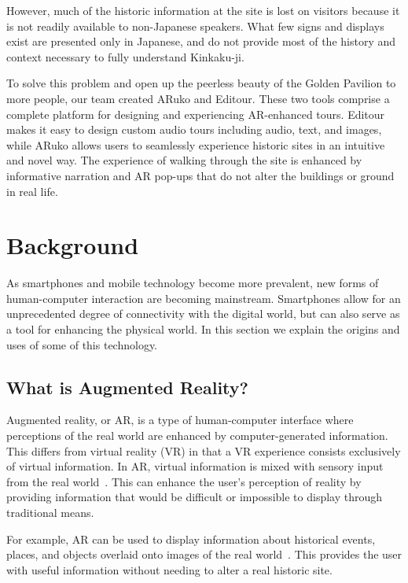 \documentclass[a4paper, 10pt, american, titlepage]{article}
\begin{document}
However, much of the historic information at the site is lost on visitors
because it is not readily available to non-Japanese speakers. What few signs and
displays exist are presented only in Japanese, and do not provide most of the
history and context necessary to fully understand Kinkaku-ji.

To solve this problem and open up the peerless beauty of the Golden Pavilion to
more people, our team created ARuko and Editour. These two tools comprise a
complete platform for designing and experiencing AR-enhanced tours. Editour
makes it easy to design custom audio tours including audio, text, and images,
while ARuko allows users to seamlessly experience historic sites in an intuitive
and novel way. The experience of walking through the site is enhanced by
informative narration and AR pop-ups that do not alter the buildings or ground
in real life.

\clearpage

\section{Background}
\label{sec:background}

As smartphones and mobile technology become more prevalent, new forms of
human-computer interaction are becoming mainstream. Smartphones allow for an
unprecedented degree of connectivity with the digital world, but can also serve
as a tool for enhancing the physical world. In this section we explain the
origins and uses of some of this technology.

\subsection{What is Augmented Reality?}
\label{sec:whatIsAugmentedReality}

Augmented reality, or AR, is a type of human-computer interface where
perceptions of the real world are enhanced by computer-generated information.
This differs from virtual reality (VR) in that a VR experience consists
exclusively of virtual information. In AR, virtual information is mixed with
sensory input from the real world~\autocite{carmigniani2011}. This can enhance
the user's perception of reality by providing information that would be
difficult or impossible to display through traditional means.

For example, AR can be used to display information about historical events,
places, and objects overlaid onto images of the real
world~\autocite{saenz2009}.  This provides the user with useful information
without needing to alter a real historic site.
\end{document}
